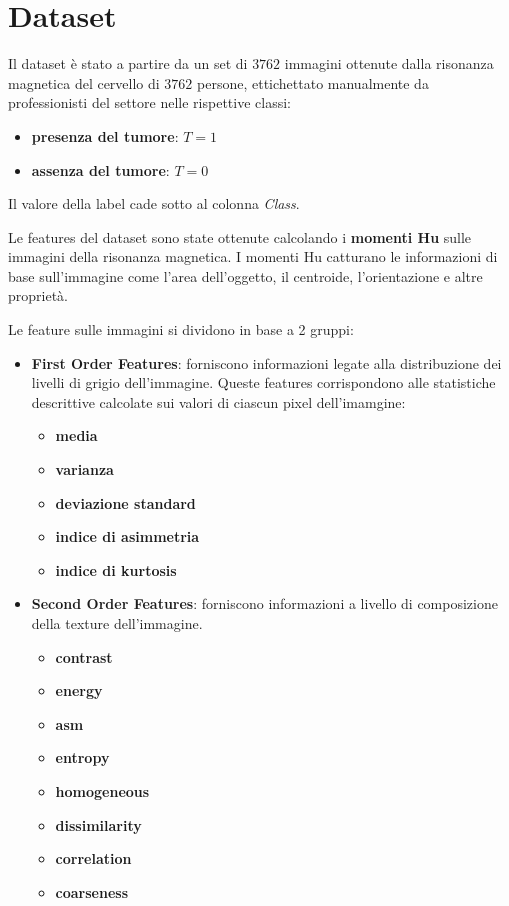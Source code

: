 \chapter{Dataset}
Il dataset è stato a partire da un set di $3762$ immagini ottenute dalla risonanza
magnetica del cervello di $3762$ persone, ettichettato manualmente da professionisti
del settore nelle rispettive classi:
\begin{itemize}
    \item \textbf{presenza del tumore}: $T = 1$
    \item \textbf{assenza del tumore}: $T = 0$
\end{itemize} 
Il valore della label cade sotto al colonna \textit{Class}.

Le features del dataset sono state ottenute calcolando i \textbf{momenti Hu}  sulle 
immagini della risonanza magnetica. I momenti Hu catturano le informazioni di base
sull'immagine come l'area dell'oggetto, il centroide, l'orientazione e altre proprietà.

Le feature sulle immagini si dividono in base a 2 gruppi\cite{explanation-features}:
\begin{itemize}
    \item \textbf{First Order Features}: forniscono informazioni legate alla
    distribuzione dei livelli di grigio dell'immagine. Queste features corrispondono
    alle statistiche descrittive calcolate sui valori di ciascun pixel dell'imamgine:
    \begin{itemize}
        \item \textbf{media}
        \item \textbf{varianza}
        \item \textbf{deviazione standard}
        \item \textbf{indice di asimmetria}
        \item \textbf{indice di kurtosis}
    \end{itemize}
    \item \textbf{Second Order Features}: forniscono informazioni a livello di 
    composizione della texture dell'immagine. 
    \begin{itemize}
        \item \textbf{contrast}
        \item \textbf{energy}
        \item \textbf{asm}
        \item \textbf{entropy}
        \item \textbf{homogeneous}
        \item \textbf{dissimilarity}
        \item \textbf{correlation}
        \item \textbf{coarseness}
    \end{itemize}
\end{itemize}

